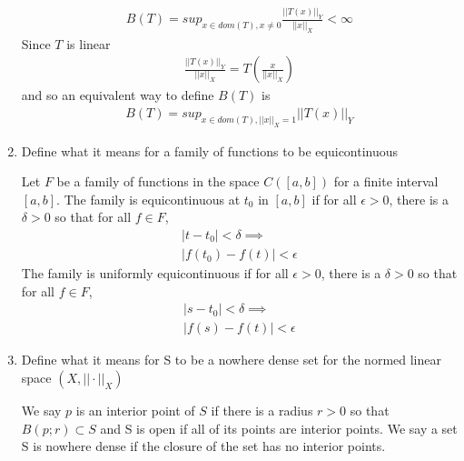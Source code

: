 \documentclass[11pt]{SelfArxOneColBMN}
\begin{document}
\begin{enumerate}
\begin{solution}
    \begin{eqnarray*}
      B(T) = sup_{x\in dom(T), x\neq0} \frac{||T(x)||_Y}{||x||_X} < \infty
    \end{eqnarray*}
    Since $T$ is linear
    \begin{eqnarray*}
      \frac{||T(x)||_Y}{||x||_X} = T(\frac{x}{||x||_X})
    \end{eqnarray*}
    and so an equivalent way to define $B(T)$ is
    \begin{eqnarray*}
      B(T) = sup_{x\in dom(T),||x||_X = 1}||T(x)||_Y
    \end{eqnarray*}
  \end{solution}
  \item Define what it means for a family of functions to be equicontinuous
  \begin{solution}
    Let $F$ be a family of functions in the space $C([a,b])$ for a finite interval $[a,b]$. The family is equicontinuous at $t_0$ in $[a,b]$ if for all $\epsilon > 0$, there is a $\delta > 0$ so that for all $f \in F$,
    \begin{eqnarray*}
      |t - t_0| < \delta \implies \\
      |f(t_0) - f(t)| < \epsilon
    \end{eqnarray*}
    The family is uniformly equicontinuous if for all $\epsilon > 0$, there is a $\delta > 0$ so that for all $f \in F$,
    \begin{eqnarray*}
      |s - t_0| < \delta \implies\\
      |f(s) - f(t)| < \epsilon
    \end{eqnarray*}
  \end{solution}
  \item Define what it means for S to be a nowhere dense set for the normed linear space $(X,||\cdot||_X)$
  \begin{solution}
    We say $p$ is an interior point of $S$ if there is a radius $r > 0$ so that $B(p;r) \subset S$ and S is open if all of its points are interior points. We say a set S is nowhere dense if the closure of the set has no interior points.
  \end{solution}
\end{enumerate}
\end{document}
